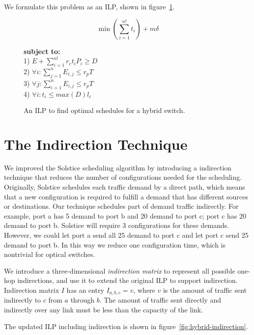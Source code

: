 We formulate this problem as an ILP, shown in figure~\ref{fig:hybrid-optimization}.

\begin{figure}[t]
\small
\centering
\begin{mdframed}
\[
\min \left(\sum_{i=1}^{n!} t_i\right) + m\delta
\]
\begin{tabbing}
\textbf{subject to:}\\[4pt]
1) $E + \sum_{i=1}^{n!} r_c t_i P_i \geq D$\\[4pt]
2) $\forall i: \sum_{j=1}^{n} E_{i,j} \leq r_p T$\\[4pt]
3) $\forall j: \sum_{i=1}^{n} E_{i,j} \leq r_p T$\\[4pt]
4) $\forall i: t_i \leq \textit{max}(D) l_i$
\end{tabbing}
\end{mdframed}
\caption{An ILP to find optimal schedules for a hybrid switch.}
\label{fig:hybrid-optimization}
\end{figure}

\section{The Indirection Technique}
\label{sec:indirection}
We improved the Solstice scheduling
algorithm by introducing a indirection technique that reduces the number
of configurations needed for the scheduling. Originally, Solstice
schedules each traffic demand by a direct path, which means that a new
configuration is required to fulfill a demand that has different sources
or destinations. Our technique schedules part of demand traffic
indirectly. For example, port a has 5 demand to port b and 20
demand to port c; port c has 20 demand to port b. Solstice will require
3 configurations for these demands. However, we could let port a send
all 25 demand to port c and let port c send 25 demand to port b. In this
way we reduce one configuration time, which is nontrivial for optical
switches. 

We introduce a three-dimensional {\it indirection matrix} to represent all possible one-hop
indirections, and use it to extend the original ILP to support indirection. Indirection matrix
$I$ has an entry $I_{a,b,c} = v$, where $v$ is the amount of traffic sent indirectly to $c$ from $a$
through $b$. The amount of traffic sent directly and indirectly over any link must be less than
the capacity of the link.


The updated ILP including indirection is shown in figure~\ref{fig:hybrid-indirection}.


